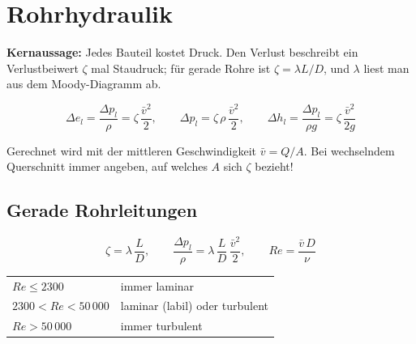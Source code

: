 \documentclass[11pt,a4paper]{article}
\begin{document}
\section{Rohrhydraulik}

\textbf{Kernaussage:} Jedes Bauteil kostet Druck. Den Verlust beschreibt ein Verlustbeiwert $\zeta$ mal Staudruck; für gerade Rohre ist $\zeta = \lambda L/D$, und $\lambda$ liest man aus dem Moody-Diagramm ab.

\begin{formel}[title={Verlustansatz}]
\[
\Delta e_l = \frac{\Delta p_l}{\rho} = \zeta\,\frac{\bar v^2}{2}, \qquad
\Delta p_l = \zeta\,\rho\,\frac{\bar v^2}{2}, \qquad
\Delta h_l = \frac{\Delta p_l}{\rho g} = \zeta\,\frac{\bar v^2}{2g}
\]
\end{formel}
Gerechnet wird mit der mittleren Geschwindigkeit $\bar v = Q/A$. Bei wechselndem Querschnitt immer angeben, auf welches $A$ sich $\zeta$ bezieht!

\subsection{Gerade Rohrleitungen}

\begin{formel}
\[
\zeta = \lambda\,\frac{L}{D}, \qquad \frac{\Delta p_l}{\rho} = \lambda\,\frac{L}{D}\,\frac{\bar v^2}{2}, \qquad Re = \frac{\bar v\,D}{\nu}
\]
\end{formel}

\begin{center}
\small
\begin{tabular}{@{}ll@{}}
\toprule
$Re \le 2300$ & immer laminar \\
$2300 < Re < 50\,000$ & laminar (labil) oder turbulent \\
$Re > 50\,000$ & immer turbulent \\
\bottomrule
\end{tabular}
\end{center}
\end{document}
